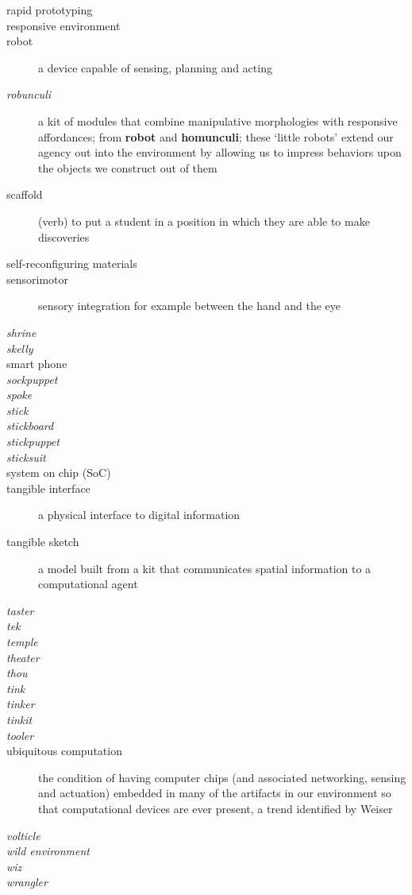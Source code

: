 \begin{description}
%
\item[rapid prototyping]
%
\item[responsive environment]
%
\item[robot] a device capable of sensing, planning and acting
%
\item[\emph{robunculi}] a kit of modules that combine manipulative morphologies with responsive affordances; from {\bf robot} and {\bf homunculi}; these `little robots' extend our agency out into the environment by allowing us to impress behaviors upon the objects we construct out of them
%
\item[scaffold] (verb) to put a student in a position in which they are able to make discoveries
%
\item[self-reconfiguring materials]
%
\item[sensorimotor] sensory integration for example between the hand and the eye
%
\item[\emph{shrine}]
%
\item[\emph{skelly}]
%
\item[smart phone]
%
\item[\emph{sockpuppet}]
%
\item[\emph{spoke}]
%
\item[\emph{stick}]
%
\item[\emph{stickboard}]
%
\item[\emph{stickpuppet}]
%
\item[\emph{sticksuit}]
%
\item[system on chip (SoC)]
%
\item[tangible interface] a physical interface to digital information
%
\item[tangible sketch] a model built from a kit that communicates spatial information to a computational agent
%
\item[\emph{taster}]
%
\item[\emph{tek}]
%
\item[\emph{temple}]
%
\item[\emph{theater}]
%
\item[\emph{thou}]
%
\item[\emph{tink}]
%
\item[\emph{tinker}]
%
\item[\emph{tinkit}]
%
\item[\emph{tooler}]
%
\item[ubiquitous computation] the condition of having computer chips (and associated networking, sensing and actuation) embedded in many of the artifacts in our environment so that computational devices are ever present, a trend identified by Weiser \citeyearpar{weiser_1999}
%
\item[\emph{volticle}]
%
\item[\emph{wild environment}]
%
\item[\emph{wiz}]
%
\item[\emph{wrangler}]
%
\end{description}

